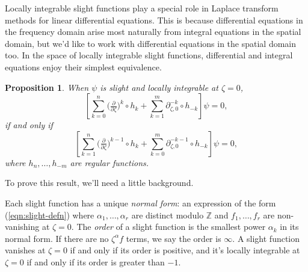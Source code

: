 \documentclass{article}
\newcommand{\Z}{\mathbb{Z}}
\newcommand{\fracderiv}[3]{\partial^{#1}_{#2, #3}}
\newtheorem{prop}[definition]{Proposition}
\begin{document}
Locally integrable slight functions play a special role in Laplace transform methods for linear differential equations. This is because differential equations in the frequency domain arise most naturally from integral equations in the spatial domain, but we'd like to work with differential equations in the spatial domain too. In the space of locally integrable slight functions, differential and integral equations enjoy their simplest equivalence.
\begin{prop}\label{prop:shifting}
When $\psi$ is slight and locally integrable at $\zeta = 0$,
\[ \left[ \sum_{k = 0}^n \big(\tfrac{\partial}{\partial \zeta}\big)^k \circ h_k + \sum_{k = 1}^m \fracderiv{-k}{\zeta}{0} \circ h_{-k} \right] \psi = 0, \]
if and only if
\[ \left[ \sum_{k = 1}^n \big(\tfrac{\partial}{\partial \zeta}\big)^{k-1} \circ h_k + \sum_{k = 0}^m \fracderiv{-k-1}{\zeta}{0} \circ h_{-k} \right] \psi = 0, \]
where $h_n, \ldots, h_{-m}$ are regular functions.
\end{prop}
To prove this result, we'll need a little background.

Each slight function has a unique {\em normal form}: an expression of the form (\ref{eqn:slight-defn}) where $\alpha_1, \ldots, \alpha_r$ are distinct modulo $\Z$ and $f_1, \ldots, f_r$ are non-vanishing at $\zeta = 0$. The {\em order} of a slight function is the smallest power $\alpha_k$ in its normal form. If there are no $\zeta^\alpha f$ terms, we say the order is $\infty$. A slight function vanishes at $\zeta = 0$ if and only if its order is positive, and it's locally integrable at $\zeta = 0$ if and only if its order is greater than $-1$.
\end{document}
